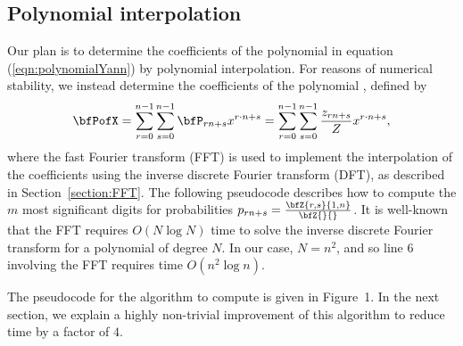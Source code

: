 \subsection{Polynomial interpolation}
Our plan is to determine the coefficients of the polynomial
\emZ{} in equation (\ref{eqn:polynomialYann}) by
polynomial interpolation.  For reasons of numerical stability,
we instead determine the coefficients of the polynomial \bfPofX,
defined by
\begin{align}
\label{eqn:polynomialYannP}
\bfPofX =
\sum_{r=0}^{n-1} \sum_{s=0}^{n-1}  \bfP_{rn+s}
 x^{r\cdot n + s} =
\sum_{r=0}^{n-1} \sum_{s=0}^{n-1}  \frac{z_{rn+s}}{Z}
 x^{r\cdot n + s},
\end{align}
where the fast Fourier transform (FFT) is used to implement the
interpolation of
the coefficients using the inverse discrete Fourier transform (DFT), as
described in Section~\ref{section:FFT}.  The following pseudocode describes how
to compute the $m$ most significant digits
for probabilities
$p_{rn+s} = \frac{\bfZ{r,s}{1,n}}{\bfZ{}{}}$. It is well-known that
the FFT requires $O(N \log N)$ time to solve the inverse discrete
Fourier transform for a polynomial of degree $N$. In our case,
$N=n^2$, and so line 6 involving the FFT requires time $O(n^2 \log n)$.

The pseudocode for the algorithm to compute \bfPofX is given in
Figure~1.
In the next section, we explain a highly non-trivial improvement of
this algorithm to reduce time by a factor of $4$.

